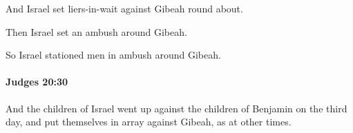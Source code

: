			\begin{versebox}
					\item[BHS] 
					\item[ASV] And Israel set liers-in-wait against Gibeah round about.
					\item[NIV] Then Israel set an ambush around Gibeah.
					\item[NRSV] So Israel stationed men in ambush around Gibeah.
			\end{versebox}

		\paragraph{Judges 20:30} %
			\label{JUDGES-20-30}

			And the children of Israel went up against the children of Benjamin on the third day, and put themselves in array against Gibeah, as at other times.


